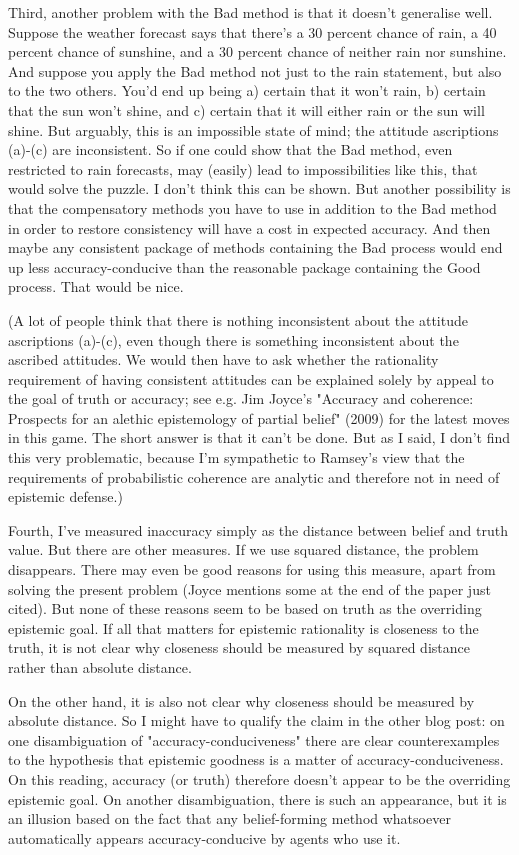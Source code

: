 \documentclass{article}
\begin{document}
Third, another problem with the Bad method is that it doesn't generalise well. Suppose the weather forecast says that there's a 30 percent chance of rain, a 40 percent chance of sunshine, and a 30 percent chance of neither rain nor sunshine. And suppose you apply the Bad method not just to the rain statement, but also to the two others. You'd end up being a) certain that it won't rain, b) certain that the sun won't shine, and c) certain that it will either rain or the sun will shine. But arguably, this is an impossible state of mind; the attitude ascriptions (a)-(c) are inconsistent. So if one could show that the Bad method, even restricted to rain forecasts, may (easily) lead to impossibilities like this, that would solve the puzzle. I don't think this can be shown. But another possibility is that the compensatory methods you have to use in addition to the Bad method in order to restore consistency will have a cost in expected accuracy. And then maybe any consistent package of methods containing the Bad process would end up less accuracy-conducive than the reasonable package containing the Good process. That would be nice.

(A lot of people think that there is nothing inconsistent about the attitude ascriptions (a)-(c), even though there is something inconsistent about the ascribed attitudes. We would then have to ask whether the rationality requirement of having consistent attitudes can be explained solely by appeal to the goal of truth or accuracy; see e.g. Jim Joyce's "Accuracy and coherence: Prospects for an alethic epistemology of partial belief" (2009) for the latest moves in this game. The short answer is that it can't be done. But as I said, I don't find this very problematic, because I'm sympathetic to Ramsey's view that the requirements of probabilistic coherence are analytic and therefore not in need of epistemic defense.)

Fourth, I've measured inaccuracy simply as the distance between belief and truth value. But there are other measures. If we use squared distance, the problem disappears. There may even be good reasons for using this measure, apart from solving the present problem (Joyce mentions some at the end of the paper just cited). But none of these reasons seem to be based on truth as the overriding epistemic goal. If all that matters for epistemic rationality is closeness to the truth, it is not clear why closeness should be measured by squared distance rather than absolute distance.

On the other hand, it is also not clear why closeness should be measured by absolute distance. So I might have to qualify the claim in the other blog post: on one disambiguation of "accuracy-conduciveness" there are clear counterexamples to the hypothesis that epistemic goodness is a matter of accuracy-conduciveness. On this reading, accuracy (or truth) therefore doesn't appear to be the overriding epistemic goal. On another disambiguation, there is such an appearance, but it is an illusion based on the fact that any belief-forming method whatsoever automatically appears accuracy-conducive by agents who use it.
\end{document}
